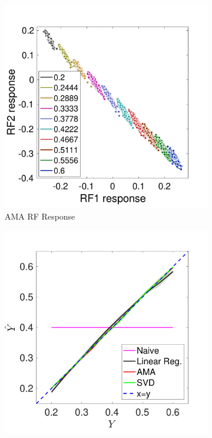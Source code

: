 \documentclass{jov}
\begin{document}
\begin{figure}
\begin{subfigure}[b]{0.20 \textwidth}
        \includegraphics[width=\textwidth]{Figure4/case9FiltersResponse.pdf}
        \caption{AMA RF Response}
        \label{fig:case9FiltersResponse}
    \end{subfigure}
        \begin{subfigure}[b]{0.20 \textwidth}
        \includegraphics[width=\textwidth]{Figure4/case9Results.pdf}

\end{subfigure}
\end{figure}
\end{document}
